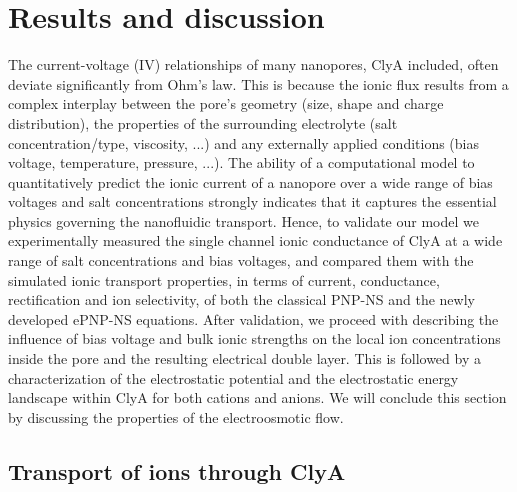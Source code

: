 \documentclass[journal=ancac3,manuscript=article,etalmode=truncate,maxauthors=0,layout=onecolumn]{achemso}
\begin{document}



\section{Results and discussion}\label{sec:results}

The current-voltage (IV) relationships of many nanopores, ClyA included, often
deviate significantly from Ohm's law. This is because the ionic flux results
from a complex interplay between the pore's geometry (size, shape and charge
distribution), the properties of the surrounding electrolyte (salt
concentration/type, viscosity, ...) and any externally applied conditions (bias
voltage, temperature, pressure, ...). The ability of a computational model to
quantitatively predict the ionic current of a nanopore over a wide range of bias
voltages and salt concentrations strongly indicates that it captures the
essential physics governing the nanofluidic transport. Hence, to validate our
model we experimentally measured the single channel ionic conductance of ClyA at
a wide range of salt concentrations and bias voltages, and compared them with
the simulated ionic transport properties, in terms of current, conductance,
rectification and ion selectivity, of both the classical PNP-NS and the newly
developed ePNP-NS equations. After validation, we proceed with describing the
influence of bias voltage and bulk ionic strengths on the local ion
concentrations inside the pore and the resulting electrical double layer. This
is followed by a characterization of the electrostatic potential and the
electrostatic energy landscape within ClyA for both cations and anions. We will
conclude this section by discussing the properties of the electroosmotic flow.

\subsection{Transport of ions through ClyA}\label{sec:iont}


\end{document}
